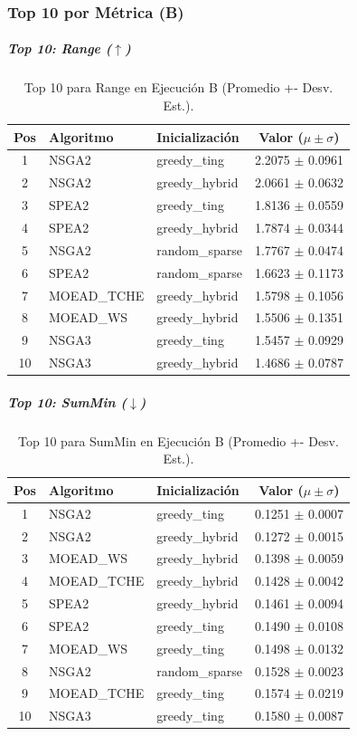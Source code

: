 \documentclass[a4paper,10pt]{article}
\begin{document}
\subsubsection{Top 10 por Métrica (B)}
\subparagraph{Top 10: Range ($\uparrow$)}
\begin{table}[H]
    \centering
    \begin{tabular}{cllc}
        \toprule
        Pos & Algoritmo & Inicialización & Valor ($\mu \pm \sigma$) \\
        \midrule
        1 & NSGA2 & greedy\_ting & 2.2075 $\pm$ 0.0961 \\
        2 & NSGA2 & greedy\_hybrid & 2.0661 $\pm$ 0.0632 \\
        3 & SPEA2 & greedy\_ting & 1.8136 $\pm$ 0.0559 \\
        4 & SPEA2 & greedy\_hybrid & 1.7874 $\pm$ 0.0344 \\
        5 & NSGA2 & random\_sparse & 1.7767 $\pm$ 0.0474 \\
        6 & SPEA2 & random\_sparse & 1.6623 $\pm$ 0.1173 \\
        7 & MOEAD\_TCHE & greedy\_hybrid & 1.5798 $\pm$ 0.1056 \\
        8 & MOEAD\_WS & greedy\_hybrid & 1.5506 $\pm$ 0.1351 \\
        9 & NSGA3 & greedy\_ting & 1.5457 $\pm$ 0.0929 \\
        10 & NSGA3 & greedy\_hybrid & 1.4686 $\pm$ 0.0787 \\
        \bottomrule
    \end{tabular}
    \caption{Top 10 para Range en Ejecución B (Promedio +- Desv. Est.).}
\end{table}

\subparagraph{Top 10: SumMin ($\downarrow$)}
\begin{table}[H]
    \centering
    \begin{tabular}{cllc}
        \toprule
        Pos & Algoritmo & Inicialización & Valor ($\mu \pm \sigma$) \\
        \midrule
        1 & NSGA2 & greedy\_ting & 0.1251 $\pm$ 0.0007 \\
        2 & NSGA2 & greedy\_hybrid & 0.1272 $\pm$ 0.0015 \\
        3 & MOEAD\_WS & greedy\_hybrid & 0.1398 $\pm$ 0.0059 \\
        4 & MOEAD\_TCHE & greedy\_hybrid & 0.1428 $\pm$ 0.0042 \\
        5 & SPEA2 & greedy\_hybrid & 0.1461 $\pm$ 0.0094 \\
        6 & SPEA2 & greedy\_ting & 0.1490 $\pm$ 0.0108 \\
        7 & MOEAD\_WS & greedy\_ting & 0.1498 $\pm$ 0.0132 \\
        8 & NSGA2 & random\_sparse & 0.1528 $\pm$ 0.0023 \\
        9 & MOEAD\_TCHE & greedy\_ting & 0.1574 $\pm$ 0.0219 \\
        10 & NSGA3 & greedy\_ting & 0.1580 $\pm$ 0.0087 \\
        \bottomrule
    \end{tabular}
    \caption{Top 10 para SumMin en Ejecución B (Promedio +- Desv. Est.).}
\end{table}
\end{document}
